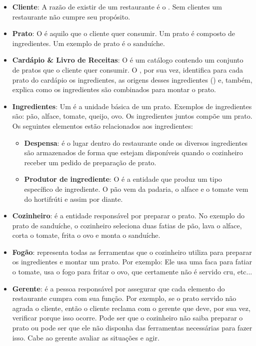\begin{itemize}
    \item \textbf{Cliente}:  A razão de existir de um restaurante é o \CLIENTE. Sem clientes um restaurante não cumpre seu propósito.

    \item \textbf{Prato}: O \PRATO \xspace é aquilo que o cliente quer consumir. Um prato é composto de ingredientes. Um exemplo de prato é o sanduíche.
    
    \item \textbf{Cardápio \& Livro de Receitas}: O \CARDAPIO \xspace é um catálogo contendo um conjunto de pratos que o cliente quer consumir.  O \LIVRODERECEITAS, por sua vez, identifica para cada prato do cardápio os ingredientes, as origens desses ingredientes (\PRODUTORES)
    e, também, explica como os ingredientes são combinados para montar o prato.
    
    \item \textbf{Ingredientes}: Um \INGREDIENTE \xspace é a unidade básica de um prato. Exemplos de ingredientes são: pão, alface, tomate, queijo, ovo. Os ingredientes juntos compõe um prato. Os seguintes elementos estão relacionados aos ingredientes:
    
    \begin{itemize}
        \item \textbf{Despensa}: \DESPENSA \xspace é o lugar dentro do restaurante onde os diversos ingredientes são armazenados de forma que estejam disponíveis quando o cozinheiro receber um pedido de preparação de prato. 
        
        \item \textbf{Produtor de ingrediente}: O \PRODUTOR \xspace é a entidade que produz um tipo específico de ingrediente. O pão vem da padaria, o alface e o tomate vem do hortifrúti e assim por diante.
    \end{itemize}

    \item \textbf{Cozinheiro}: \COZINHEIRO \xspace é a entidade responsável por preparar o prato. No exemplo do prato de sanduíche, o cozinheiro seleciona duas fatias de pão, lava o alface, corta o tomate, frita o ovo e monta o sanduíche.
    
    \item \textbf{Fogão}: \FOGAO \xspace representa todas as ferramentas que o cozinheiro utiliza para preparar os ingredientes e montar um prato. Por exemplo: Ele usa uma faca para fatiar o tomate, usa o fogo para fritar o ovo, que certamente não é servido cru, etc... 
    
    \item \textbf{Gerente}:  \GERENTE \xspace é a pessoa responsável por assegurar que cada elemento do restaurante cumpra com sua função. Por exemplo, se o prato servido não agrada o cliente, então o cliente reclama com o gerente que deve, por sua vez, verificar porque isso ocorre. Pode ser que o cozinheiro não saiba preparar o prato ou pode ser que ele não disponha das ferramentas necessárias para fazer isso. Cabe ao gerente avaliar as situações e agir.
\end{itemize}

